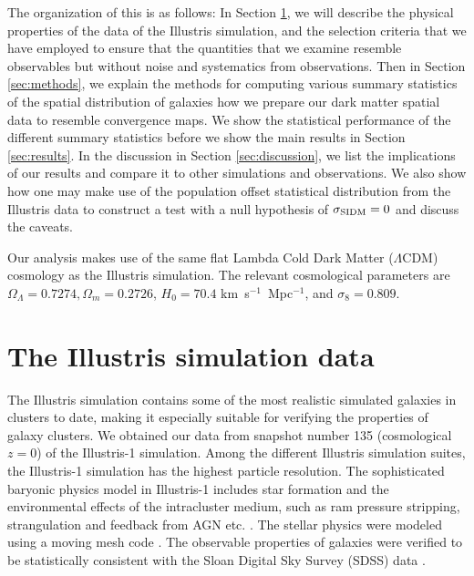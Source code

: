 The organization of this  is as follows:
In Section \ref{sec:illustris_sim}, we will describe the physical properties of 
the data of the Illustris
simulation, 
and the selection criteria that we have employed to ensure that the
quantities that we examine resemble observables but without noise and
systematics from observations. 
Then in Section \ref{sec:methods}, 
we explain the methods for computing various 
summary statistics of the spatial distribution of galaxies how we prepare our dark
matter spatial data to resemble convergence maps. We show the statistical performance
of the different summary statistics before we show the main results
in Section \ref{sec:results}. In the discussion in Section \ref{sec:discussion}, 
we list the implications of our
results and compare it to other simulations and observations. We also 
show how one may make use of the population offset statistical distribution
from the Illustris data to construct a test with 
a null hypothesis of $\sigma_{\rm SIDM} = 0$ and discuss the caveats. 

	Our analysis makes use of the same flat Lambda Cold Dark Matter ($\Lambda$CDM) cosmology
as the Illustris simulation. The relevant cosmological parameters are
$\Omega_\Lambda = 0.7274, \Omega_m = 0.2726$, $H_0 = 70.4$
km~s$^{-1}$~Mpc$^{-1}$, and $\sigma_8 = 0.809$.

\section{The Illustris simulation data} 
\label{sec:illustris_sim}
The Illustris simulation contains some of the most
realistic simulated galaxies in clusters to date, making it especially suitable for 
verifying the properties of galaxy clusters. We obtained our data from 
snapshot number 135 (cosmological $z=0$) of the Illustris-1 simulation. 
Among the different Illustris simulation suites,
the Illustris-1 simulation has the highest particle resolution. 
The sophisticated baryonic physics model in Illustris-1 
includes star formation and the environmental effects of the intracluster medium, 
such as ram pressure stripping,
strangulation and feedback from AGN etc. \citep{Genel2014a}.
The stellar physics were modeled using a moving mesh code {} \citep{Springel2010}.
The observable properties of galaxies were verified to be statistically consistent
with the Sloan Digital Sky Survey (SDSS) data \citep{Vogelsberger2014}. 

